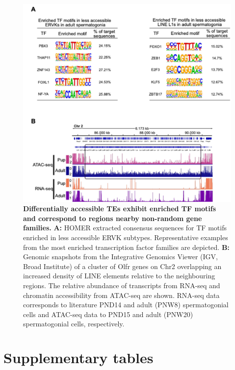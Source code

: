 \documentclass[12pt,twoside]{reedthesis}
\begin{document}
\begin{figure}[htbp]

{\centering \includegraphics{thesis_files/figure-latex/ds6-1} 

}

\caption[Differentially accessible TEs exhibit enriched TF motifs and correspond to regions nearby non-random gene families]{\textbf{Differentially accessible TEs exhibit enriched TF motifs and correspond to regions nearby non-random gene families.} \textbf{A:} HOMER extracted consensus sequences for TF motifs enriched in less accessible ERVK subtypes. Representative examples from the most enriched transcription factor families are depicted. \textbf{B:} Genomic snapshots from the Integrative Genomics Viewer (IGV, Broad Institute) of a cluster of Olfr genes on Chr2 overlapping an increased density of LINE elements relative to the neighbouring regions. The relative abundance of transcripts from RNA-seq and chromatin accessibility from ATAC-seq are shown. RNA-seq data corresponds to literature PND14 and adult (PNW8) spermatogonial cells and ATAC-seq data to PND15 and adult (PNW20) spermatogonial cells, respectively.}\label{fig:ds6}
\end{figure}
\newpage

\hypertarget{st}{%
\section{Supplementary tables}\label{st}}
\end{document}
